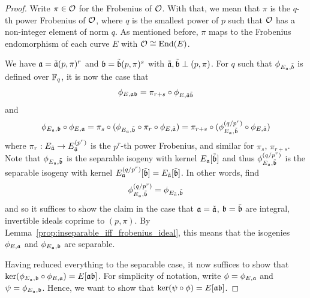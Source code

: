 \begin{proof}
    Write $\pi \in \mathcal{O}$ for the Frobenius of $\mathcal{O}$.
    With that, we mean that $\pi$ is the $q$-th power Frobenius of $\mathcal{O}$, where $q$ is the smallest power of $p$ such that $\mathcal{O}$ has a non-integer element of norm $q$.
    As mentioned before, $\pi$ maps to the Frobenius endomorphism of each curve $E$ with $\mathcal{O} \cong \mathrm{End}(E)$.
    
    We have $\mathfrak{a} = \tilde{\mathfrak{a}} (p, \pi)^r$ and $\mathfrak{b} = \tilde{\mathfrak{b}} (p, \pi)^s$ with $\tilde{\mathfrak{a}}, \tilde{\mathfrak{b}} \perp (p, \pi)$.
    For $q$ such that $\phi_{E_{\mathfrak{a}}, \tilde{b}}$ is defined over $\mathbb{F}_q$, it is now the case that
    \begin{equation*}
        \phi_{E, \mathfrak{a}\mathfrak{b}} = \pi_{r + s} \circ \phi_{E, \tilde{\mathfrak{a}} \tilde{\mathfrak{b}}}
    \end{equation*}
    and
    \begin{equation*}
        \phi_{E_{\mathfrak{a}}, \mathfrak{b}} \circ \phi_{E, \mathfrak{a}} = \pi_s \circ (\phi_{E_{\mathfrak{a}}, \tilde{\mathfrak{b}}} \circ \pi_r \circ \phi_{E, \tilde{\mathfrak{a}}}) = \pi_{r + s} \circ (\phi_{E_{\mathfrak{a}}, \tilde{\mathfrak{b}}}^{(q/p^r)} \circ \phi_{E, \tilde{\mathfrak{a}}})
    \end{equation*}
    where $\pi_r: E_{\tilde{\mathfrak{a}}} \to E_{\tilde{\mathfrak{a}}}^{(p^r)}$ is the $p^r$-th power Frobenius, and similar for $\pi_s$, $\pi_{r + s}$. 
    Note that $\phi_{E_{\mathfrak{a}}, \tilde{\mathfrak{b}}}$ is the separable isogeny with kernel $E_{\mathfrak{a}}[\tilde{\mathfrak{b}}]$ and thus $\phi_{E_{\mathfrak{a}}, \tilde{\mathfrak{b}}}^{(q/p^r)}$ is the separable isogeny with kernel $E_{\mathfrak{a}}^{(q/p^r)}[\tilde{\mathfrak{b}}] = E_{\tilde{\mathfrak{a}}}[\tilde{\mathfrak{b}}]$.
    In other words, find
    \begin{equation*}
        \phi_{E_{\mathfrak{a}}, \tilde{\mathfrak{b}}}^{(q/p^r)} = \phi_{E_{\tilde{\mathfrak{a}}}, \tilde{\mathfrak{b}}}
    \end{equation*}
    and so it suffices to show the claim in the case that $\mathfrak{a} = \tilde{\mathfrak{a}}$, $\mathfrak{b} = \tilde{\mathfrak{b}}$ are integral, invertible ideals coprime to $(p, \pi)$.
    By Lemma~\ref{prop:inseparable_iff_frobenius_ideal}, this means that the isogenies $\phi_{E, \mathfrak{a}}$ and $\phi_{E_{\mathfrak{a}}, \mathfrak{b}}$ are separable.

    Having reduced everything to the separable case, it now suffices to show that $\ker(\phi_{E_{\mathfrak{a}}, \mathfrak{b}} \circ \phi_{E, \mathfrak{a}}) = E[\mathfrak{a}\mathfrak{b}]$.
    For simplicity of notation, write $\phi = \phi_{E, \mathfrak{a}}$ and $\psi = \phi_{E_{\mathfrak{a}}, \mathfrak{b}}$.
    Hence, we want to show that $\ker(\psi \circ \phi) = E[\mathfrak{a}\mathfrak{b}]$.


\end{proof}
